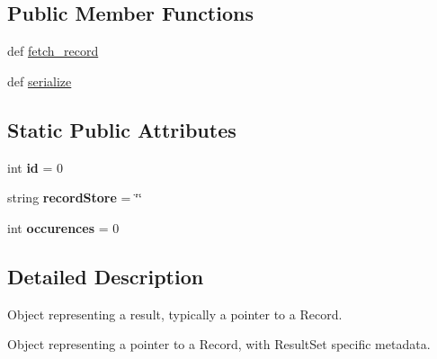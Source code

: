 \subsection*{Public Member Functions}
\begin{DoxyCompactItemize}
\item 
def \hyperlink{classcheshire3_1_1base_objects_1_1_result_set_item_ad76b07022863bf2226a4834ebf14993b}{fetch\-\_\-record}
\item 
def \hyperlink{classcheshire3_1_1base_objects_1_1_result_set_item_aadea4758120036e08d815d78b60f531d}{serialize}
\end{DoxyCompactItemize}
\subsection*{Static Public Attributes}
\begin{DoxyCompactItemize}
\item 
\hypertarget{classcheshire3_1_1base_objects_1_1_result_set_item_ab4492abcc35dada183e6890f242d73a2}{int {\bfseries id} = 0}\label{classcheshire3_1_1base_objects_1_1_result_set_item_ab4492abcc35dada183e6890f242d73a2}

\item 
\hypertarget{classcheshire3_1_1base_objects_1_1_result_set_item_a62de06296b2d69fccc437c55d2066c75}{string {\bfseries record\-Store} = \char`\"{}\char`\"{}}\label{classcheshire3_1_1base_objects_1_1_result_set_item_a62de06296b2d69fccc437c55d2066c75}

\item 
\hypertarget{classcheshire3_1_1base_objects_1_1_result_set_item_af5748624642a2a0e30069a38f35e8b23}{int {\bfseries occurences} = 0}\label{classcheshire3_1_1base_objects_1_1_result_set_item_af5748624642a2a0e30069a38f35e8b23}

\end{DoxyCompactItemize}


\subsection{Detailed Description}
\begin{DoxyVerb}Object representing a result, typically a pointer to a Record.

Object representing a pointer to a Record, with ResultSet specific 
metadata.
\end{DoxyVerb}
 

